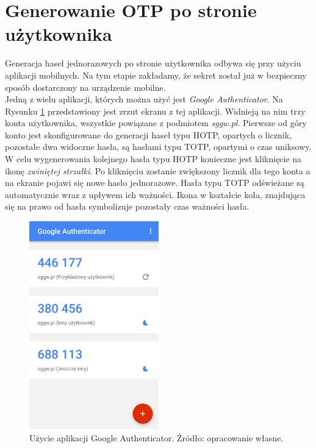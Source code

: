 \section{Generowanie OTP po stronie użytkownika}
Generacja haseł jednorazowych po stronie użytkownika odbywa się przy użyciu aplikacji mobilnych. 
Na tym etapie zakładamy, że sekret został już w bezpieczny sposób dostarczony na urządzenie mobilne. \\
Jedną z wielu aplikacji, których można użyć jest \textit{Google Authenticator}. 
Na Rysunku \ref{mobile-google} przedstawiony jest zrzut ekranu z tej aplikacji. 
Widnieją na nim trzy konta użytkownika, wszystkie powiązane z podmiotem \textit{sggw.pl}. 
Pierwsze od góry konto jest skonfigurowane do generacji haseł typu HOTP, opartych o licznik,
pozostałe dwa widoczne hasła, są hasłami typu TOTP, opartymi o czas uniksowy.
W celu wygenerowania kolejnego hasła typu HOTP konieczne jest kliknięcie na ikonę \textit{zwiniętej strzałki}.
Po kliknięciu zostanie zwiększony licznik dla tego konta a na ekranie pojawi się nowe hasło jednorazowe.
Hasła typu TOTP odświeżane są automatycznie wraz z upływem ich ważności. 
Ikona w kształcie koła, znajdująca się na prawo od hasła symbolizuje pozostały czas ważności hasła.
\begin{figure}[t]
    \centering
	\includegraphics[width=0.5\textwidth]{content/images/mobile-google}
	\caption{Użycie aplikacji Google Authenticator. Źródło: opracowanie własne.}
    \label{mobile-google}
\end{figure} \\
